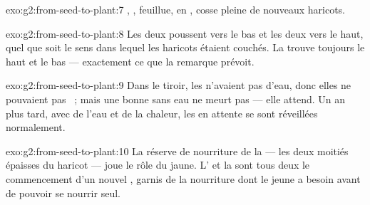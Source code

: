 \begin{solution}{exo:g2:from-seed-to-plant:7}
, ,  feuillue,  en , cosse pleine
de nouveaux haricots.
\end{solution}

\begin{solution}{exo:g2:from-seed-to-plant:8}
Les deux  poussent vers le bas et les deux  vers le
haut, quel que soit le sens dans lequel les haricots étaient
couchés. La  trouve toujours le haut et le bas ---
exactement ce que la remarque prévoit.
\end{solution}

\begin{solution}{exo:g2:from-seed-to-plant:9}
Dans le tiroir, les  n'avaient pas d'eau, donc elles ne
pouvaient pas ~; mais une bonne  sans eau ne meurt pas
--- elle attend. Un an plus tard, avec de l'eau et de la chaleur,
les  en attente se sont réveillées normalement.
\end{solution}

\begin{solution}{exo:g2:from-seed-to-plant:10}
La réserve de nourriture de la  --- les deux moitiés épaisses
du haricot --- joue le rôle du jaune. L' et la  sont tous
deux le commencement d'un nouvel , garnis de la
nourriture dont le jeune a besoin avant de pouvoir se nourrir seul.
\end{solution}

